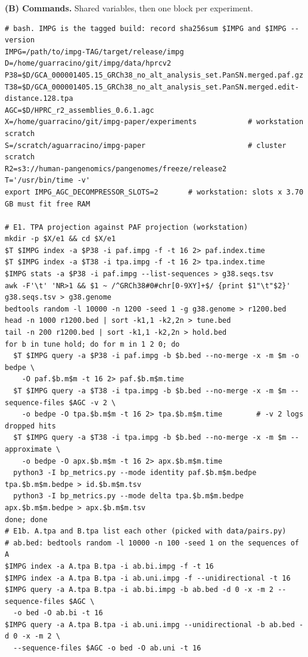 \medskip
\noindent\textbf{(B) Commands.} Shared variables, then one block per experiment.

{\scriptsize
\begin{verbatim}
# bash. IMPG is the tagged build: record sha256sum $IMPG and $IMPG --version
IMPG=/path/to/impg-TAG/target/release/impg
D=/home/guarracino/git/impg/data/hprcv2
P38=$D/GCA_000001405.15_GRCh38_no_alt_analysis_set.PanSN.merged.paf.gz
T38=$D/GCA_000001405.15_GRCh38_no_alt_analysis_set.PanSN.merged.edit-distance.128.tpa
AGC=$D/HPRC_r2_assemblies_0.6.1.agc
X=/home/guarracino/git/impg-paper/experiments            # workstation scratch
S=/scratch/aguarracino/impg-paper                        # cluster scratch
R2=s3://human-pangenomics/pangenomes/freeze/release2
T='/usr/bin/time -v'
export IMPG_AGC_DECOMPRESSOR_SLOTS=2       # workstation: slots x 3.70 GB must fit free RAM

# E1. TPA projection against PAF projection (workstation)
mkdir -p $X/e1 && cd $X/e1
$T $IMPG index -a $P38 -i paf.impg -f -t 16 2> paf.index.time
$T $IMPG index -a $T38 -i tpa.impg -f -t 16 2> tpa.index.time
$IMPG stats -a $P38 -i paf.impg --list-sequences > g38.seqs.tsv
awk -F'\t' 'NR>1 && $1 ~ /^GRCh38#0#chr[0-9XY]+$/ {print $1"\t"$2}' g38.seqs.tsv > g38.genome
bedtools random -l 10000 -n 1200 -seed 1 -g g38.genome > r1200.bed
head -n 1000 r1200.bed | sort -k1,1 -k2,2n > tune.bed
tail -n 200 r1200.bed | sort -k1,1 -k2,2n > hold.bed
for b in tune hold; do for m in 1 2 0; do
  $T $IMPG query -a $P38 -i paf.impg -b $b.bed --no-merge -x -m $m -o bedpe \
    -O paf.$b.m$m -t 16 2> paf.$b.m$m.time
  $T $IMPG query -a $T38 -i tpa.impg -b $b.bed --no-merge -x -m $m --sequence-files $AGC -v 2 \
    -o bedpe -O tpa.$b.m$m -t 16 2> tpa.$b.m$m.time        # -v 2 logs dropped hits
  $T $IMPG query -a $T38 -i tpa.impg -b $b.bed --no-merge -x -m $m --approximate \
    -o bedpe -O apx.$b.m$m -t 16 2> apx.$b.m$m.time
  python3 -I bp_metrics.py --mode identity paf.$b.m$m.bedpe tpa.$b.m$m.bedpe > id.$b.m$m.tsv
  python3 -I bp_metrics.py --mode delta tpa.$b.m$m.bedpe apx.$b.m$m.bedpe > apx.$b.m$m.tsv
done; done
# E1b. A.tpa and B.tpa list each other (picked with data/pairs.py)
# ab.bed: bedtools random -l 10000 -n 100 -seed 1 on the sequences of A
$IMPG index -a A.tpa B.tpa -i ab.bi.impg -f -t 16
$IMPG index -a A.tpa B.tpa -i ab.uni.impg -f --unidirectional -t 16
$IMPG query -a A.tpa B.tpa -i ab.bi.impg -b ab.bed -d 0 -x -m 2 --sequence-files $AGC \
  -o bed -O ab.bi -t 16
$IMPG query -a A.tpa B.tpa -i ab.uni.impg --unidirectional -b ab.bed -d 0 -x -m 2 \
  --sequence-files $AGC -o bed -O ab.uni -t 16


\end{verbatim}}
